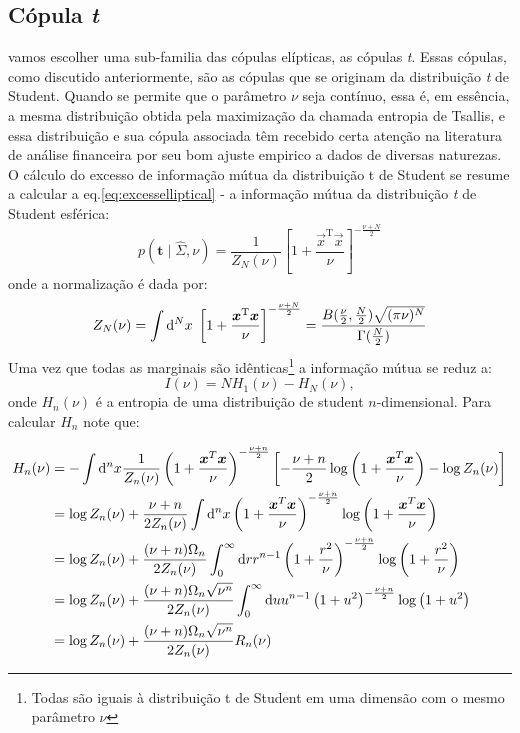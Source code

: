 \subsection{Cópula \textit{t}}
 vamos escolher uma sub-familia das cópulas elípticas, as cópulas \textit{t}. Essas cópulas, como discutido anteriormente, são as cópulas que se originam da distribuição \textit{t} de Student. Quando se permite que o parâmetro $\nu$ seja contínuo, essa é, em essência, a mesma distribuição obtida pela maximização da chamada entropia de Tsallis, e essa distribuição e sua cópula associada têm recebido certa atenção na literatura de análise financeira por seu bom ajuste empirico a dados de diversas naturezas\cite{Demarta2005, Borland2002}. O cálculo do excesso de informação mútua da distribuição t de Student se resume a calcular a eq.\eqref{eq:excesselliptical} - a informação mútua da distribuição \textit{t} de Student esférica:
\begin{equation}
	p(\mathbf{t}\mid \hat{\Sigma},\nu) =  \frac{1}{Z_{N}(\nu)}\left[1+ \frac{\vec{x}^{\mathrm{T}}\vec{x}}{\nu}\right]^{-\frac{\nu+N}{2}}
\end{equation}
onde a normalização é dada por:
\begin{equation}
  Z_N(\nu) = \int \mathrm{d}^N x \;\left[1+ \frac{\bm{x}^{\mathrm{T}}\bm{x}}{\nu}\right]^{-\frac{\nu+N}{2}} =  \frac{B(\frac{\nu}{2},\frac{N}{2})\sqrt{(\pi\nu)^{N}}}{\Gamma(\frac{N}{2})}
\end{equation}
Uma vez que todas as marginais são idênticas\footnote{Todas são iguais à distribuição t de Student em uma dimensão com o mesmo parâmetro $\nu$} a informação mútua se reduz a:
\begin{equation}
 I(\nu) =  N H_{1}(\nu) - H_{N}(\nu),
\end{equation}
onde $H_n(\nu)$ é a entropia de uma distribuição de student $n$-dimensional. Para calcular $H_n$ note que:
\begin{fullwidth}
\begin{align*}
H_n(\nu) &= -\int \mathrm{d}^n x \frac{1}{Z_n(\nu)} \left(1 + \frac{\bm{x}^T\bm{x}}{\nu}\right)^{-\frac{\nu+n}{2}} \left[-\frac{\nu+n}{2} \log\left(1 + \frac{\bm{x}^T\bm{x}}{\nu}\right) -\log Z_n(\nu)\right] \\
	 &= \log Z_n(\nu) + \frac{\nu+n}{2Z_n(\nu)} \int \mathrm{d}^n x \left(1 + \frac{\bm{x}^T\bm{x}}{\nu}\right)^{-\frac{\nu+n}{2}} \log\left(1 + \frac{\bm{x}^T\bm{x}}{\nu}\right) \\
	 &= \log Z_n(\nu) + \frac{(\nu+n)\Omega_{n}}{2Z_n(\nu)}  \int_{0}^\infty \mathrm{d} r r^{n-1} \left(1+\frac{r^2}{\nu}\right)^{-\frac{\nu+n}{2}}\log\left(1 + \frac{r^2}{\nu}\right)\\
	 &= \log Z_n(\nu) + \frac{(\nu+n)\Omega_{n}\sqrt{\nu^n}}{2Z_n(\nu)}  \int_{0}^\infty \mathrm{d} u u^{n-1} \left(1+u^2\right)^{-\frac{\nu+n}{2}}\log\left(1 + u^2\right)\\
	 &= \log Z_n(\nu) + \frac{(\nu+n)\Omega_{n}\sqrt{\nu^n}}{2Z_n(\nu)}  R_n(\nu)
\end{align*}
\end{fullwidth}
